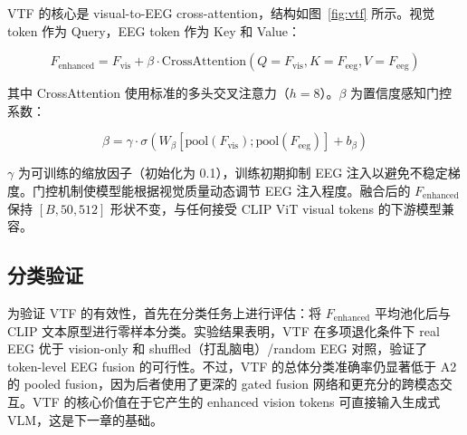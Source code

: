 VTF 的核心是 visual-to-EEG cross-attention，结构如图~\ref{fig:vtf} 所示。视觉 token 作为 Query，EEG token 作为 Key 和 Value：

\begin{equation}
  F_{\mathrm{enhanced}} = F_{\mathrm{vis}} + \beta \cdot \mathrm{CrossAttention}(Q=F_{\mathrm{vis}}, K=F_{\mathrm{eeg}}, V=F_{\mathrm{eeg}})
\end{equation}


其中 CrossAttention 使用标准的多头交叉注意力（$h=8$）。$\beta$ 为置信度感知门控系数：

\begin{equation}
  \beta = \gamma \cdot \sigma\left(W_\beta [\mathrm{pool}(F_{\mathrm{vis}}); \mathrm{pool}(F_{\mathrm{eeg}})] + b_\beta\right)
\end{equation}

$\gamma$ 为可训练的缩放因子（初始化为 0.1），训练初期抑制 EEG 注入以避免不稳定梯度。门控机制使模型能根据视觉质量动态调节 EEG 注入程度。融合后的 $F_{\mathrm{enhanced}}$ 保持 $[B, 50, 512]$ 形状不变，与任何接受 CLIP ViT visual tokens 的下游模型兼容。

\subsection{分类验证}

为验证 VTF 的有效性，首先在分类任务上进行评估：将 $F_{\mathrm{enhanced}}$ 平均池化后与 CLIP 文本原型进行零样本分类。实验结果表明，VTF 在多项退化条件下 real EEG 优于 vision-only 和 shuffled（打乱脑电）/random EEG 对照，验证了 token-level EEG fusion 的可行性。不过，VTF 的总体分类准确率仍显著低于 A2 的 pooled fusion，因为后者使用了更深的 gated fusion 网络和更充分的跨模态交互。VTF 的核心价值在于它产生的 enhanced vision tokens 可直接输入生成式 VLM，这是下一章的基础。
